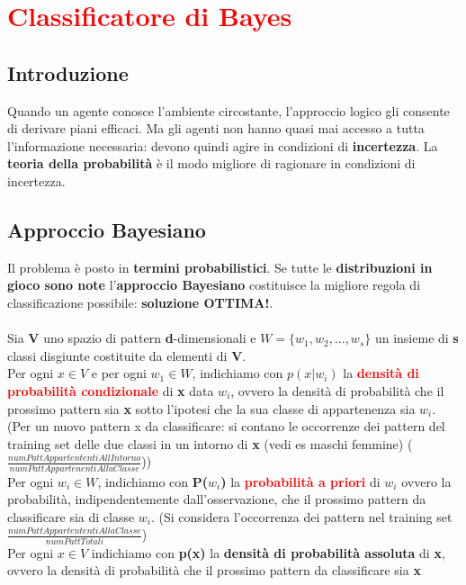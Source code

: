 \documentclass{article}
\begin{document}
\section{\textcolor{red}{Classificatore di Bayes}}
\subsection{Introduzione}
Quando un agente conosce l'ambiente circostante, l'approccio logico gli consente di derivare piani efficaci. Ma gli agenti non hanno quasi mai accesso a tutta l'informazione necessaria: devono quindi agire in condizioni di \textbf{incertezza}. La \textbf{teoria della probabilità} è il modo migliore di ragionare in condizioni di incertezza.
\subsection{Approccio Bayesiano}
Il problema è posto in \textbf{termini probabilistici}. Se tutte le \textbf{distribuzioni in gioco sono note} l'\textbf{approccio Bayesiano} costituisce la migliore regola di classificazione possibile: \textbf{soluzione OTTIMA!}.\\\\
Sia \textbf{V} uno spazio di pattern \textbf{d}-dimensionali e $W = \{ w_1,w_2,...,w_s\}$ un insieme di \textbf{s} classi disgiunte costituite da elementi di \textbf{V}.\\
Per ogni \textbf{$x \in V$} e per ogni \textbf{$w_1 \in W$}, indichiamo con $p(x|w_i)$ la \textcolor{red}{\textbf{densità di probabilità condizionale}} di \textbf{x} data \textbf{$w_i$}, ovvero la densità di probabilità che il prossimo pattern sia \textbf{x} sotto l'ipotesi che la sua classe di appartenenza sia \textbf{$w_i$}. (Per un nuovo pattern x da classificare: si contano le occorrenze dei pattern del training set delle due classi in un intorno di \textbf{x} (vedi es maschi femmine) ($\frac{numPattAppartententiAllIntorno}{numPattAppartenentiAllaClasse}$))\\
Per ogni \textbf{$w_i \in W$}, indichiamo con \textbf{P($w_i$)} la \textcolor{red}{\textbf{probabilità a priori}} di $w_i$ ovvero la probabilità, indipendentemente dall'osservazione, che il prossimo pattern da classificare sia di classe \textbf{$w_i$}. (Si considera l'occorrenza dei pattern nel training set $\frac{numPattAppartententiAllaClasse}{numPattTotali}$)\\
Per ogni \textbf{$x \in V$} indichiamo con \textbf{p(x)} la \textbf{densità di probabilità assoluta} di \textbf{x}, ovvero la densità di probabilità che il prossimo pattern da classificare sia \textbf{x}
\end{document}
